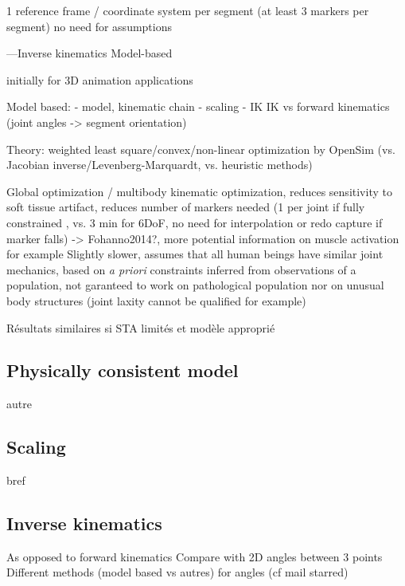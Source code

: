 1 reference frame / coordinate system per segment (at least 3 markers per segment) \cite{Wu2002, Wu2005}
no need for assumptions



---Inverse kinematics 
Model-based

initially for 3D animation applications

Model based:
- model, kinematic chain
- scaling
- IK
IK vs forward kinematics (joint angles -> segment orientation)


Theory: weighted least square/convex/non-linear optimization by OpenSim (vs. Jacobian inverse/Levenberg-Marquardt, vs. heuristic methods)


Global optimization / multibody kinematic optimization, reduces sensitivity to soft tissue artifact, reduces number of markers needed (1 per joint if fully constrained \cite{Slater2018}, vs. 3 min for 6DoF, no need for interpolation or redo capture if marker falls) -> Fohanno2014?, more potential information on muscle activation for example \cite{Robinson2013,Kainz2016}
Slightly slower, assumes that all human beings have similar joint mechanics, based on \textit{a priori} constraints inferred from observations of a population, not garanteed to work on pathological population nor on unusual body structures (joint laxity cannot be qualified for example)

Résultats similaires si STA limités et modèle approprié \cite{Kainz2016}




\subsection{Physically consistent model}

autre


\subsection{Scaling}

bref


\subsection{Inverse kinematics}



As opposed to forward kinematics \newline
Compare with 2D angles between 3 points \newline
Different methods (model based vs autres) for angles (cf mail starred)\newline


